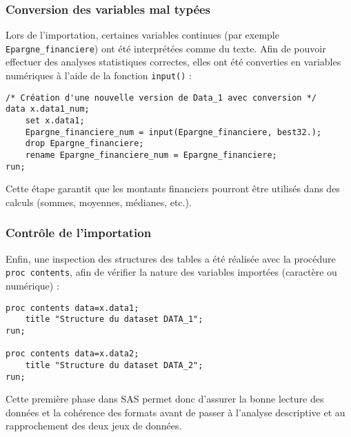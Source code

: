 \subsubsection{Conversion des variables mal typées}
Lors de l'importation, certaines variables continues (par exemple \texttt{Epargne\_financiere}) ont été interprétées comme du texte.  
Afin de pouvoir effectuer des analyses statistiques correctes, elles ont été converties en variables numériques à l'aide de la fonction \texttt{input()} :

\begin{lstlisting}[caption=Conversion de variables texte en numérique]
/* Création d'une nouvelle version de Data_1 avec conversion */
data x.data1_num;
    set x.data1;
    Epargne_financiere_num = input(Epargne_financiere, best32.);
    drop Epargne_financiere;
    rename Epargne_financiere_num = Epargne_financiere;
run;
\end{lstlisting}

Cette étape garantit que les montants financiers pourront être utilisés dans des calculs (sommes, moyennes, médianes, etc.).

\subsubsection{Contrôle de l'importation}
Enfin, une inspection des structures des tables a été réalisée avec la procédure \texttt{proc contents}, afin de vérifier la nature des variables importées (caractère ou numérique) :

\begin{lstlisting}[caption=Inspection des tables SAS]
proc contents data=x.data1;
    title "Structure du dataset DATA_1";
run;

proc contents data=x.data2;
    title "Structure du dataset DATA_2";
run;
\end{lstlisting}

Cette première phase dans SAS permet donc d'assurer la bonne lecture des données et la cohérence des formats avant de passer à l'analyse descriptive et au rapprochement des deux jeux de données.
